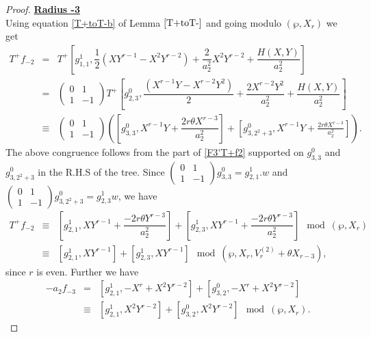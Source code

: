 \documentclass[11pt, reqno]{amsart}
\numberwithin{equation}{section}
\theoremstyle{definition}
\theoremstyle{remark}
\theoremstyle{definition}
\theoremstyle{remark}
\theoremstyle{remark}
\begin{document}
\begin{proof}
\noindent\underline{\textbf{Radius -3}}\\
Using equation \eqref{T+toT-b} of Lemma $\ref{T+toT-}$ and going modulo $(\wp,X_{r})$ we get
\begin{eqnarray}
    T^{+}f_{-2}&=& T^{+}\left[g_{1,1}^{1},\dfrac{1}{2}(XY^{r-1}-X^{2}Y^{r-2})+ \dfrac{2}{a_{2}^{2}}X^{2}Y^{r-2} + \dfrac{H(X,Y)}{a_{2}^{2}}\right] \nonumber\\
   &=& \begin{pmatrix}
       0 & 1\\
       1 & -1
   \end{pmatrix}T^{+}\left[g_{2,3}^{0}, \dfrac{(X^{r-1}Y-X^{r-2}Y^{2})}{2}+\dfrac{2X^{r-2}Y^2}{a_{2}^2}+ \dfrac{H(X,Y)}{a_{2}^2}\right] \nonumber\\
   &\equiv& \begin{pmatrix}
       0 & 1\\
       1 & -1
   \end{pmatrix}\left(\left[g_{3,3}^{0}, X^{r-1}Y + \dfrac{2r\theta X^{r-3}}{a_{2}^2}\right]+ \left[g_{3,2^2+3}^{0}, X^{r-1}Y+ \frac{2r\theta X^{r-3}}{a_{2}^2} \right]\right).\nonumber
   \end{eqnarray}
The above congruence follows from the part of \eqref{F3'T+f2} supported on $g_{3,3}^{0}$ and $g_{3,2^2+3}^{0}$ in the R.H.S of the tree. Since $\begin{pmatrix}
    0 & 1\\
    1 & -1
\end{pmatrix}g_{3,3}^{0} = g_{2,1}^{1}.w$ and $\begin{pmatrix}
    0 & 1\\
    1 & -1
\end{pmatrix}g_{3,2^{2}+3}^{0} = g_{2,3}^{1}w$, we have 
\begin{eqnarray}\label{F3'T+f-2}
 T^{+}f_{-2}&\equiv& \left[g_{2,1}^{1},XY^{r-1}+ \dfrac{-2r\theta Y^{r-3}}{a_{2}^{2}}\right]+ \left[g_{2,3}^{1},XY^{r-1}+ \dfrac{-2r\theta Y^{r-3}}{a_{2}^{2}}\right] \mod(\wp,X_{r}) \nonumber\\
 &\equiv& \left[g_{2,1}^{1},XY^{r-1}\right]+ \left[g_{2,3}^{1},XY^{r-1}\right] \mod(\wp,X_{r},V_{r}^{(2)}+\theta X_{r-3}),
 \end{eqnarray}
since $r$ is even. Further we have
\begin{eqnarray}\label{F3'a2f-3}
    -a_{2}f_{-3} &=&\left[g_{2,1}^{1},-X^{r}+X^2Y^{r-2}\right]+\left[g_{3,2}^{0}, -X^{r}+X^2Y^{r-2}\right] \nonumber\\
    &\equiv&\left[g_{2,1}^{1},X^2Y^{r-2}\right]+\left[g_{3,2}^{0},X^2Y^{r-2}\right]\mod(\wp,X_{r}).\end{eqnarray}



\end{proof}
\end{document}
